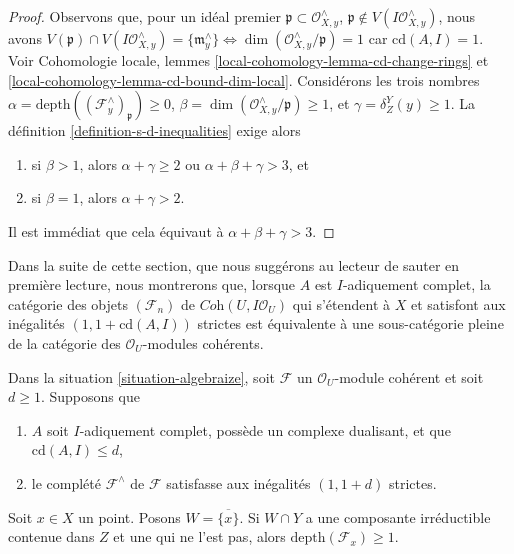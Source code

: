 \begin{proof}
Observons que, pour un idéal premier $\mathfrak p \subset \mathcal{O}_{X, y}^\wedge$,
$\mathfrak p \not \in V(I\mathcal{O}_{X, y}^\wedge)$,
nous avons $V(\mathfrak p) \cap V(I\mathcal{O}_{X, y}^\wedge) =
\{\mathfrak m_y^\wedge\}
\Leftrightarrow \dim(\mathcal{O}_{X, y}^\wedge/\mathfrak p) = 1$
car $\text{cd}(A, I) = 1$.
Voir Cohomologie locale, lemmes
\ref{local-cohomology-lemma-cd-change-rings} et
\ref{local-cohomology-lemma-cd-bound-dim-local}.
Considérons les trois nombres
$\alpha = \text{depth}((\mathcal{F}^\wedge_y)_\mathfrak p) \geq 0$,
$\beta = \dim(\mathcal{O}_{X, y}^\wedge/\mathfrak p) \geq 1$, et
$\gamma = \delta^Y_Z(y) \geq 1$.
La définition \ref{definition-s-d-inequalities} exige alors
\begin{enumerate}
\item si $\beta > 1$, alors
$\alpha + \gamma \geq 2$ ou $\alpha + \beta + \gamma > 3$, et
\item si $\beta = 1$, alors $\alpha + \gamma > 2$.
\end{enumerate}
Il est immédiat que cela équivaut à
$\alpha + \beta + \gamma > 3$.
\end{proof}

\noindent
Dans la suite de cette section, que nous suggérons au lecteur de sauter en première
lecture, nous montrerons que, lorsque $A$ est $I$-adiquement complet,
la catégorie des objets $(\mathcal{F}_n)$ de $\textit{Coh}(U, I\mathcal{O}_U)$
qui s'étendent à $X$ et satisfont aux
inégalités $(1, 1 + \text{cd}(A, I))$ strictes
est équivalente à une sous-catégorie pleine de la catégorie des
$\mathcal{O}_U$-modules cohérents.

\begin{lemma}
\label{lemma-sanity}
Dans la situation \ref{situation-algebraize}, soit $\mathcal{F}$ un
$\mathcal{O}_U$-module cohérent et soit $d \geq 1$. Supposons que
\begin{enumerate}
\item $A$ soit $I$-adiquement complet, possède un complexe dualisant, et que
$\text{cd}(A, I) \leq d$,
\item le complété $\mathcal{F}^\wedge$ de $\mathcal{F}$
satisfasse aux inégalités $(1, 1 + d)$ strictes.
\end{enumerate}
Soit $x \in X$ un point. Posons $W = \overline{\{x\}}$.
Si $W \cap Y$ a une composante irréductible contenue dans $Z$
et une qui ne l'est pas, alors $\text{depth}(\mathcal{F}_x) \geq 1$.
\end{lemma}

